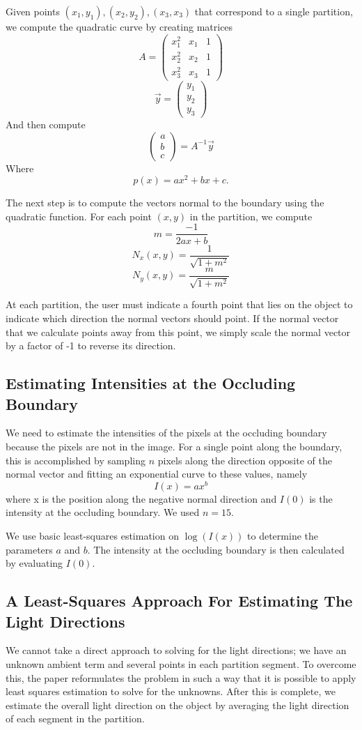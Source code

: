 \documentclass[10pt,twocolumn,letterpaper]{article}
\begin{document}
Given points $(x_1,y_1), (x_2,y_2), (x_3,x_3)$ that correspond to a single partition, we compute the quadratic curve by creating matrices 
\[A = \begin{pmatrix}
		x_1^2 & x_1 & 1\\
		x_2^2 & x_2 & 1\\
		x_3^2 & x_3 & 1
	  \end{pmatrix}\]
\[\vec{y} = \begin{pmatrix}
		y_1\\
		y_2\\
		y_3\end{pmatrix}\]
And then compute
\[\begin{pmatrix} a\\ b\\ c\end{pmatrix} = A^{-1}\vec{y}\]
Where \[p(x) = ax^2 + bx + c.\]

The next step is to compute the vectors normal to the boundary using the quadratic function. For each point $(x,y)$ in the partition, we compute \[m = \frac{-1}{2ax + b}\]
\[N_x(x,y) = \frac{1}{\sqrt{1 + m^2}}\]
\[N_y(x,y) = \frac{m}{\sqrt{1 + m^2}}\]

At each partition, the user must indicate a fourth point that lies on the object to indicate which direction the normal vectors should point. If the normal vector that we calculate points away from this point, we simply scale the normal vector by a factor of -1 to reverse its direction.

\subsection{Estimating Intensities at the Occluding Boundary}
We need to estimate the intensities of the pixels at the occluding boundary because the pixels are not in the image. For a single point along the boundary, this is accomplished by sampling $n$ pixels along the direction opposite of the normal vector and fitting an exponential curve to these values, namely \[I(x) = ax^{b}\] where x is the position along the negative normal direction and $I(0)$ is the intensity at the occluding boundary. We used $n = 15$.

We use basic least-squares estimation on $\log(I(x))$ to determine the parameters $a$ and $b$. The intensity at the occluding boundary is then calculated by evaluating $I(0)$.

\subsection{A Least-Squares Approach For Estimating The Light Directions}
We cannot take a direct approach to solving for the light directions; we have an unknown ambient term and several points in each partition segment. To overcome this, the paper reformulates the problem in such a way that it is possible to apply least squares estimation to solve for the unknowns. After this is complete, we estimate the overall light direction on the object by averaging the light direction of each segment in the partition.
\end{document}

